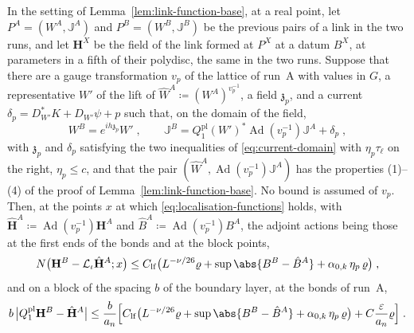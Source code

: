 \begin{lemma}\label{lem:link-field-runs}
In the setting of Lemma~\ref{lem:link-function-base}, at a real point, let $P^A = (W^A, \mathbb J^A)$ and $P^B = (W^B, \mathbb J^B)$ be the previous pairs of a link in the two runs, and let $\mathbf H^X$ be the field of the link formed at $P^X$ at a datum $B^X$, at parameters in a fifth of their polydisc, the same in the two runs. Suppose that there are a gauge transformation $v_p$ of the lattice of run~A with values in $G$, a representative $W'$ of the lift of $\hat W^A \coloneqq (W^A)^{v_p^{-1}}$, a field $\mathfrak z_p$, and a current $\delta_p = D^*_{W'}K + D_{W'}\psi + p$ such that, on the domain of the field,
\[
    W^B = e^{ih\mathfrak z_p}W'\;,
    \qquad
    \mathbb J^B = Q^{\mathrm{pl}}_1(W')^*\operatorname{Ad}(v_p^{-1})\mathbb J^A + \delta_p\;,
\]
with $\mathfrak z_p$ and $\delta_p$ satisfying the two inequalities of \eqref{eq:current-domain} with $\eta_p\tau_\ell$ on the right, $\eta_p \leq c$, and that the pair $(\hat W^A, \operatorname{Ad}(v_p^{-1})\mathbb J^A)$ has the properties (1)--(4) of the proof of Lemma~\ref{lem:link-function-base}. No bound is assumed of $v_p$. Then, at the points $x$ at which \eqref{eq:localisation-functions} holds, with $\hat{\mathbf H}^A \coloneqq \operatorname{Ad}(v_p^{-1})\mathbf H^A$ and $\hat B^A \coloneqq \operatorname{Ad}(v_p^{-1})B^A$, the adjoint actions being those at the first ends of the bonds and at the block points,
\[
    N\bigl(\mathbf H^B - \mathcal L_\iota\hat{\mathbf H}^A; x\bigr) \leq C_{\mathrm{lf}}\bigl(L^{-\nu/26}\varrho + \sup\abs{B^B - \hat B^A} + \alpha_{0,k}\,\eta_p\,\varrho\bigr)\;,
\]
and on a block of the spacing $b$ of the boundary layer, at the bonds of run~A,
\[
    b\,\bigl\lvert Q^{\mathrm{pl}}_1\mathbf H^B - \hat{\mathbf H}^A\bigr\rvert \leq \frac{b}{a_n}\Bigl[C_{\mathrm{lf}}\bigl(L^{-\nu/26}\varrho + \sup\abs{B^B - \hat B^A} + \alpha_{0,k}\,\eta_p\,\varrho\bigr) + C\frac{\varepsilon}{a_n}\varrho\Bigr]\;.
\]
\end{lemma}

